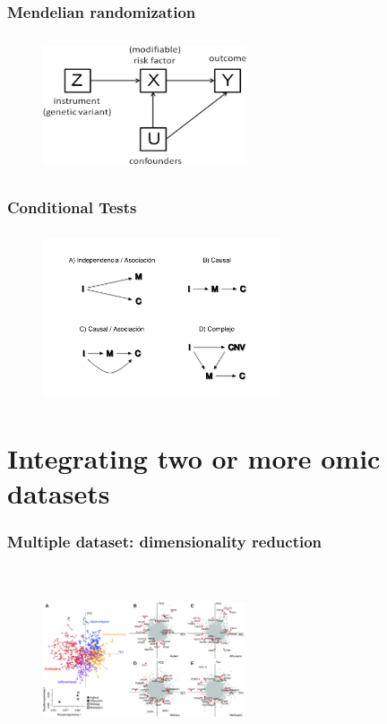 \documentclass[10pt,xcolor=dvipsnames]{beamer}\usepackage[]{graphicx}\usepackage[]{color}
\begin{document}
\begin{frame}[plain]\frametitle{Mendelian randomization}

\begin{figure}
  \includegraphics[height=4cm, width=6cm]{figures/mendelian_randomization.png}
\end{figure}

\end{frame}


\begin{frame}[plain]\frametitle{Conditional Tests}

\begin{figure}
  \includegraphics[height=5cm, width=7cm]{figures/CIT.png}
\end{figure}

\end{frame}


\section{Integrating two or more omic datasets}



\begin{frame}[plain]\frametitle{Multiple dataset: dimensionality reduction}

\begin{figure}
\begin{center}
 \includegraphics[height=5.5cm, width=6cm]{figures/multi_example.jpg}
\end{center}
\end{figure}

\end{frame}
\end{document}
